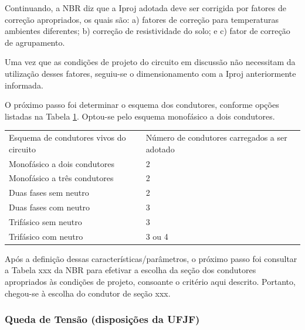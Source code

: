 Continuando, a NBR diz que a Iproj adotada deve ser corrigida por fatores de correção apropriados, os quais são: a) fatores de correção para temperaturas ambientes diferentes; b) correção de resistividade do solo; e c) fator de correção de agrupamento.

Uma vez que as condições de projeto do circuito em discussão não necessitam da utilização desses fatores, seguiu-se o dimensionamento com a Iproj anteriormente informada.

	O próximo passo foi determinar o esquema dos condutores, conforme opções listadas na Tabela \ref{metodo-definicao}. Optou-se pelo esquema monofásico a dois condutores.
	
\begin{table}[h]
\begin{tabular}{ll}
Esquema de condutores vivos do circuito & Número de condutores carregados a ser adotado \\
Monofásico a dois condutores            & 2                                             \\
Monofásico a três condutores            & 2                                             \\
Duas fases sem neutro                   & 2                                             \\
Duas fases com neutro                   & 3                                             \\
Trifásico sem neutro                    & 3                                             \\
Trifásico com neutro                    & 3 ou 4                                       
\end{tabular}
\label{metodo-definicao}
\end{table}

Após a definição dessas características/parâmetros, o próximo passo foi consultar a Tabela xxx da NBR para efetivar a escolha da seção dos condutores apropriados às condições de projeto, consoante o critério aqui descrito. Portanto, chegou-se à escolha do condutor de seção xxx.

\subsubsection{Queda de Tensão (disposições da UFJF)}

